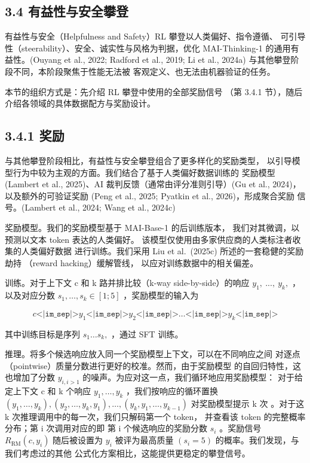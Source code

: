 \subsection{3.4 有益性与安全攀登}\label{helpfulness-and-safety-climb}

有益性与安全（Helpfulness and Safety）RL 攀登以人类偏好、指令遵循、
可引导性（steerability）、安全、诚实性与风格为判据，优化 MAI-Thinking-1
的通用有益性。(Ouyang et al., 2022; Radford
et al., 2019; Li et al., 2024a) 与其他攀登阶段不同，本阶段聚焦于性能无法被
客观定义、也无法由机器验证的任务。

本节的组织方式是：先介绍 RL 攀登中使用的全部奖励信号
（第 3.4.1 节），随后介绍各领域的具体数据配方与奖励设计。

\subsection{3.4.1 奖励}\label{rewards}

与其他攀登阶段相比，有益性与安全攀登组合了更多样化的奖励类型，
以引导模型行为中较为主观的方面。我们结合了基于人类偏好数据训练的
奖励模型 (Lambert et al., 2025)、AI 裁判反馈（通常由评分准则引导）(Gu et al., 2024)，
以及额外的可验证奖励
(Peng et al., 2025; Pyatkin et al., 2026)，形成聚合奖励
信号。(Lambert et al., 2024; Wang et al., 2024c)

奖励模型。我们的奖励模型基于 MAI-Base-1 的后训练版本，
我们对其微调，以预测以文本 token 表达的人类偏好。
该模型仅使用由多家供应商的人类标注者收集的人类偏好数据
进行训练。我们采用 Liu et al.~(2025c) 所述的一套稳健的奖励劫持
（reward hacking）缓解管线，
以应对训练数据中的相关偏差。

训练。对于上下文 c 和 k 路并排比较（k-way side-by-side）的响应
\(y _ { 1 } , ~ . . . , ~ y _ { k } ,\) ，以及对应分数
\(s _ { 1 } , \ldots , s _ { k } \in [ 1 ; 5 ]\) ，奖励模型的输入为

\[
c \texttt{<|im\_sep|>} y_1 \texttt{<|im\_sep|>} y_2 \texttt{<|im\_sep|>} \ldots \texttt{<|im\_sep|>} y_k \texttt{<|im\_sep|>}
\]

其中训练目标是序列
\(s _ { 1 } \ldots s _ { k } ,\) ，通过 SFT 训练。

推理。将多个候选响应放入同一个奖励模型上下文，可以在不同响应之间
对逐点（pointwise）质量分数进行更好的校准。然而，由于奖励模型
的自回归特性，这也增加了分数
\(y _ { i , i > 1 }\) 的噪声。为应对这一点，我们循环地应用奖励模型：
对于给定上下文 c 和 k 个响应
\(y _ { 1 } , \ldots , y _ { k }\) ，我们按响应的循环置换
\(( y _ { 1 } , \dots , y _ { k } ) , ( y _ { 2 } , \dots , y _ { k } , y _ { 1 } ) , \dots , ( y _ { k } , y _ { 1 } , \dots , y _ { k - 1 } )\)
对奖励模型提示 k 次
。对于这 k 次推理调用中的每一次，我们只解码第一个 token，
并查看该 token 的完整概率分布；第 i 次调用对应的即
第 i 个候选响应的奖励分数 \(s _ { i }\) 。奖励信号
\(R _ { \mathrm { R M } } ( c , y _ { i } )\) 随后被设置为
\(y _ { i }\) 被评为最高质量
\(( s _ { i } = 5 )\) 的概率。我们发现，与我们考虑过的其他
公式化方案相比，这能提供更稳定的攀登信号。

